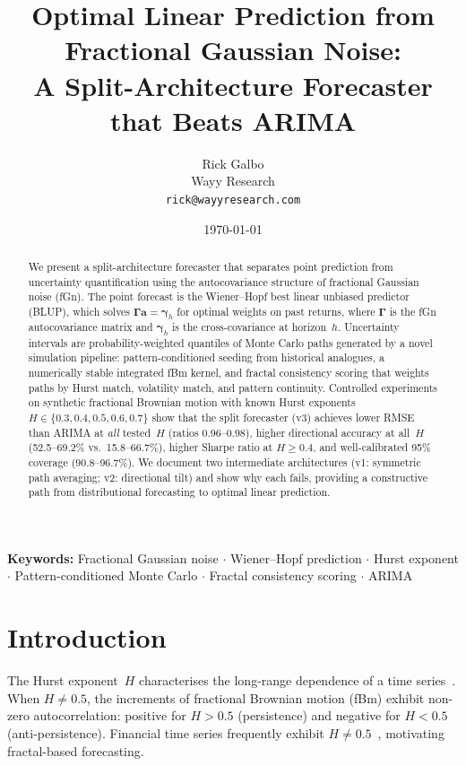 \documentclass[12pt,a4paper]{article}
\title{%
  Optimal Linear Prediction from Fractional Gaussian Noise:\\
  A Split-Architecture Forecaster that Beats ARIMA%
}
\author{
  Rick Galbo\\
  Wayy Research\\
  \texttt{rick@wayyresearch.com}
}
\date{\today}
\begin{document}
\maketitle

\begin{abstract}
We present a split-architecture forecaster that separates point prediction
from uncertainty quantification using the autocovariance structure of
fractional Gaussian noise (fGn).  The point forecast is the Wiener--Hopf
best linear unbiased predictor (BLUP), which solves
$\boldsymbol{\Gamma}\mathbf{a} = \boldsymbol{\gamma}_h$ for optimal
weights on past returns, where $\boldsymbol{\Gamma}$ is the fGn
autocovariance matrix and $\boldsymbol{\gamma}_h$ is the cross-covariance
at horizon~$h$.  Uncertainty intervals are probability-weighted quantiles
of Monte Carlo paths generated by a novel simulation pipeline:
pattern-conditioned seeding from historical analogues, a numerically
stable integrated fBm kernel, and fractal consistency scoring that
weights paths by Hurst match, volatility match, and pattern continuity.
Controlled experiments on synthetic fractional Brownian motion with known
Hurst exponents $H \in \{0.3, 0.4, 0.5, 0.6, 0.7\}$ show that the
split forecaster (v3) achieves lower RMSE than ARIMA at \emph{all}
tested~$H$ (ratios 0.96--0.98), higher directional accuracy at all~$H$
(52.5--69.2\% vs.\ 15.8--66.7\%), higher Sharpe ratio at $H \geq 0.4$,
and well-calibrated 95\% coverage (90.8--96.7\%).  We document two
intermediate architectures (v1: symmetric path averaging; v2: directional
tilt) and show why each fails, providing a constructive path from
distributional forecasting to optimal linear prediction.
\end{abstract}

\smallskip
\noindent\textbf{Keywords:} Fractional Gaussian noise $\cdot$
Wiener--Hopf prediction $\cdot$ Hurst exponent $\cdot$
Pattern-conditioned Monte Carlo $\cdot$
Fractal consistency scoring $\cdot$ ARIMA

\section{Introduction}
\label{sec:introduction}

The Hurst exponent~$H$ characterises the long-range dependence of a time
series~\citep{Hurst1951,MandelbrotVanNess1968}.  When $H \neq 0.5$, the
increments of fractional Brownian motion (fBm) exhibit non-zero
autocorrelation: positive for $H > 0.5$ (persistence) and negative for
$H < 0.5$ (anti-persistence).  Financial time series frequently exhibit
$H \neq 0.5$~\citep{Peters1994,Cont2001}, motivating fractal-based
forecasting.
\end{document}
